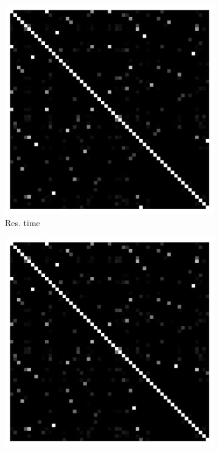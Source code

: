 \begin{figure}[t]
	\centering
        \begin{subfigure}{0.19\textwidth}
                \includegraphics[width=\linewidth]{Figures/cassandra-runtime-commitX.pdf}
                \caption{Res. time}
        \end{subfigure}%
        \begin{subfigure}{0.19\textwidth}
                \includegraphics[width=\linewidth]{Figures/cassandra-cpu-commitX.pdf}

\end{subfigure}
\end{figure}
